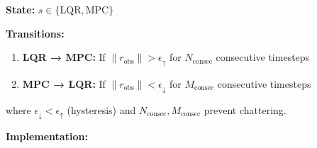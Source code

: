\documentclass[
  letterpaper,
  DIV=11,
  numbers=noendperiod]{scrartcl}
\providecommand{\tightlist}{%
  \setlength{\itemsep}{0pt}\setlength{\parskip}{0pt}}\usepackage{longtable,booktabs,array}
\begin{document}
\textbf{State:} \(s \in \{\text{LQR}, \text{MPC}\}\)

\textbf{Transitions:}

\begin{enumerate}
\def\labelenumi{\arabic{enumi}.}
\tightlist
\item
  \textbf{LQR → MPC:} If \(\|r_{\text{obs}}\| > \epsilon_{\uparrow}\)
  for \(N_{\text{consec}}\) consecutive timesteps
\item
  \textbf{MPC → LQR:} If \(\|r_{\text{obs}}\| < \epsilon_{\downarrow}\)
  for \(M_{\text{consec}}\) consecutive timesteps
\end{enumerate}

where \(\epsilon_{\downarrow} < \epsilon_{\uparrow}\) (hysteresis) and
\(N_{\text{consec}}, M_{\text{consec}}\) prevent chattering.

\textbf{Implementation:}
\end{document}
